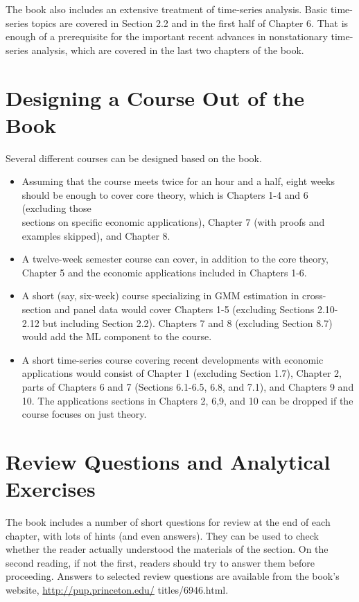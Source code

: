 \documentclass[10pt]{article}
\begin{document}
The book also includes an extensive treatment of time-series analysis. Basic time-series topics are covered in Section 2.2 and in the first half of Chapter 6. That is enough of a prerequisite for the important recent advances in nonstationary time-series analysis, which are covered in the last two chapters of the book.

\section*{Designing a Course Out of the Book}
Several different courses can be designed based on the book.

\begin{itemize}
  \item Assuming that the course meets twice for an hour and a half, eight weeks should be enough to cover core theory, which is Chapters 1-4 and 6 (excluding those\\
sections on specific economic applications), Chapter 7 (with proofs and examples skipped), and Chapter 8.
  \item A twelve-week semester course can cover, in addition to the core theory, Chapter 5 and the economic applications included in Chapters 1-6.
  \item A short (say, six-week) course specializing in GMM estimation in cross-section and panel data would cover Chapters 1-5 (excluding Sections 2.10-2.12 but including Section 2.2). Chapters 7 and 8 (excluding Section 8.7) would add the ML component to the course.
  \item A short time-series course covering recent developments with economic applications would consist of Chapter 1 (excluding Section 1.7), Chapter 2, parts of Chapters 6 and 7 (Sections 6.1-6.5, 6.8, and 7.1), and Chapters 9 and 10. The applications sections in Chapters 2, 6,9, and 10 can be dropped if the course focuses on just theory.
\end{itemize}

\section*{Review Questions and Analytical Exercises}
The book includes a number of short questions for review at the end of each chapter, with lots of hints (and even answers). They can be used to check whether the reader actually understood the materials of the section. On the second reading, if not the first, readers should try to answer them before proceeding. Answers to selected review questions are available from the book's website, \href{http://pup.princeton.edu/}{http://pup.princeton.edu/} titles/6946.html.
\end{document}
